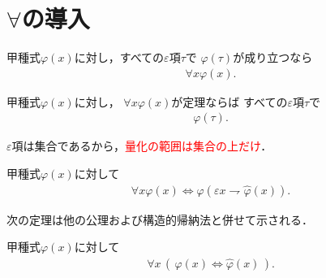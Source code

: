 \section{$\forall$の導入}
	\begin{screen}
		\begin{logicalaxm}
			甲種式$\varphi(x)$に対し，すべての$\varepsilon$項$\tau$で
			$\varphi(\tau)$が成り立つなら
			\begin{align}
				\forall x \varphi(x).
			\end{align}
		\end{logicalaxm}
	\end{screen}
	
	\begin{screen}
		\begin{logicalaxm}
			甲種式$\varphi(x)$に対し，
			$\forall x \varphi(x)$が定理ならば
			すべての$\varepsilon$項$\tau$で
			\begin{align}
				\varphi(\tau).
			\end{align}
		\end{logicalaxm}
	\end{screen}

\newpage
	$\varepsilon$項は集合であるから，\textcolor{red}{量化の範囲は集合の上だけ}．
	
	\begin{screen}
		\begin{thm}
			甲種式$\varphi(x)$に対して
			\begin{align}
				\forall x \varphi(x) \Longleftrightarrow
				\varphi\left(\varepsilon x \rightharpoondown \hat{\varphi}(x)\right).
			\end{align}
		\end{thm}
	\end{screen}
	
	次の定理は他の公理および構造的帰納法と併せて示される．
	
	\begin{screen}
		\begin{thm}[書き換えの同値性]
			甲種式$\varphi(x)$に対して
			\begin{align}
				\forall x\,
				\left(\, \varphi(x) \Longleftrightarrow \hat{\varphi}(x)\, \right).
			\end{align}
		\end{thm}
	\end{screen}
